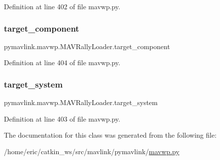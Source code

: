 Definition at line 402 of file mavwp.\+py.

\mbox{\label{classpymavlink_1_1mavwp_1_1MAVRallyLoader_af0fd1de971ba030f24d897219f4094cb}} 
\subsubsection{\texorpdfstring{target\_component}{target\_component}}
{\footnotesize\ttfamily pymavlink.\+mavwp.\+M\+A\+V\+Rally\+Loader.\+target\+\_\+component}



Definition at line 404 of file mavwp.\+py.

\mbox{\label{classpymavlink_1_1mavwp_1_1MAVRallyLoader_a48808a91e7229e6cf1825dadf630b59f}} 
\subsubsection{\texorpdfstring{target\_system}{target\_system}}
{\footnotesize\ttfamily pymavlink.\+mavwp.\+M\+A\+V\+Rally\+Loader.\+target\+\_\+system}



Definition at line 403 of file mavwp.\+py.



The documentation for this class was generated from the following file\+:\begin{DoxyCompactItemize}
\item 
/home/eric/catkin\+\_\+ws/src/mavlink/pymavlink/\mbox{\hyperlink{mavwp_8py}{mavwp.\+py}}\end{DoxyCompactItemize}
